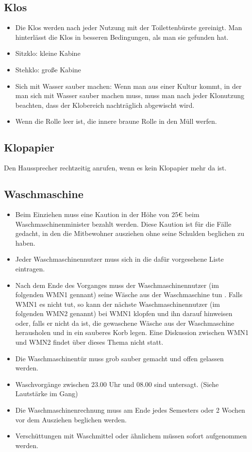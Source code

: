 \documentclass[10pt,a4paper,final]{article}
\begin{document}
\subsection{Klos}
\begin{itemize}
\item Die Klos werden nach jeder Nutzung mit der Toilettenbürste gereinigt. Man hinterlässt die Klos in besseren Bedingungen, als man sie gefunden hat.
\item Sitzklo: kleine Kabine
\item Stehklo: große Kabine
\item Sich mit Wasser sauber machen: Wenn man aus einer Kultur kommt, in der man sich mit Wasser sauber machen muss, muss man nach jeder Klonutzung beachten, dass der Klobereich nachträglich abgewischt wird.
\item Wenn die Rolle leer ist, die innere braune Rolle in den Müll werfen.
\end{itemize}

 
\subsection{Klopapier} Den Haussprecher rechtzeitig anrufen, wenn es kein Klopapier mehr da ist.

\subsection{Waschmaschine}

\begin{itemize}
\item Beim Einziehen muss eine Kaution in der Höhe von 25€ beim Waschmaschinenminister bezahlt werden. Diese Kaution ist für die Fälle gedacht, in den die Mitbewohner ausziehen ohne seine Schulden beglichen zu haben.
\item Jeder Waschmaschinennutzer muss sich in die dafür vorgesehene Liste eintragen. 
\item Nach dem Ende des Vorganges muss der Waschmaschinennutzer (im folgenden WMN1 gennant) seine Wäsche aus der Waschmaschine tun . Falls WMN1 es nicht tut, so kann der nächste Waschmaschinennutzer (im folgenden WMN2 genannt) bei WMN1 klopfen und ihn darauf hinweisen oder, falls er nicht da ist, die gewaschene Wäsche aus der Waschmaschine herausholen und in ein sauberes Korb legen. Eine Diskussion zwischen WMN1 und WMN2 findet über dieses Thema nicht statt.
\item Die Waschmaschinentür muss grob sauber gemacht und offen gelassen werden.
\item Waschvorgänge zwischen 23.00 Uhr und 08.00 sind untersagt. (Siehe Lautstärke im Gang)
\item Die Waschmaschinenrechnung muss am  Ende jedes Semesters oder 2 Wochen vor dem Ausziehen beglichen werden.
\item Verschüttungen mit Waschmittel oder ähnlichem müssen sofort aufgenommen werden.

\end{itemize}
\end{document}
